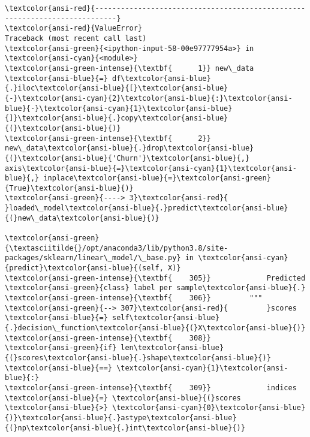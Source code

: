 \documentclass[11pt]{article}
\begin{document}
    \begin{Verbatim}[commandchars=\\\{\}, frame=single, framerule=2mm, rulecolor=\color{outerrorbackground}]
\textcolor{ansi-red}{---------------------------------------------------------------------------}
\textcolor{ansi-red}{ValueError}                                Traceback (most recent call last)
\textcolor{ansi-green}{<ipython-input-58-00e97777954a>} in \textcolor{ansi-cyan}{<module>}
\textcolor{ansi-green-intense}{\textbf{      1}} new\_data \textcolor{ansi-blue}{=} df\textcolor{ansi-blue}{.}iloc\textcolor{ansi-blue}{[}\textcolor{ansi-blue}{-}\textcolor{ansi-cyan}{2}\textcolor{ansi-blue}{:}\textcolor{ansi-blue}{-}\textcolor{ansi-cyan}{1}\textcolor{ansi-blue}{]}\textcolor{ansi-blue}{.}copy\textcolor{ansi-blue}{(}\textcolor{ansi-blue}{)}
\textcolor{ansi-green-intense}{\textbf{      2}} new\_data\textcolor{ansi-blue}{.}drop\textcolor{ansi-blue}{(}\textcolor{ansi-blue}{'Churn'}\textcolor{ansi-blue}{,} axis\textcolor{ansi-blue}{=}\textcolor{ansi-cyan}{1}\textcolor{ansi-blue}{,} inplace\textcolor{ansi-blue}{=}\textcolor{ansi-green}{True}\textcolor{ansi-blue}{)}
\textcolor{ansi-green}{----> 3}\textcolor{ansi-red}{ }loaded\_model\textcolor{ansi-blue}{.}predict\textcolor{ansi-blue}{(}new\_data\textcolor{ansi-blue}{)}

\textcolor{ansi-green}{\textasciitilde{}/opt/anaconda3/lib/python3.8/site-packages/sklearn/linear\_model/\_base.py} in \textcolor{ansi-cyan}{predict}\textcolor{ansi-blue}{(self, X)}
\textcolor{ansi-green-intense}{\textbf{    305}}             Predicted \textcolor{ansi-green}{class} label per sample\textcolor{ansi-blue}{.}
\textcolor{ansi-green-intense}{\textbf{    306}}         """
\textcolor{ansi-green}{--> 307}\textcolor{ansi-red}{         }scores \textcolor{ansi-blue}{=} self\textcolor{ansi-blue}{.}decision\_function\textcolor{ansi-blue}{(}X\textcolor{ansi-blue}{)}
\textcolor{ansi-green-intense}{\textbf{    308}}         \textcolor{ansi-green}{if} len\textcolor{ansi-blue}{(}scores\textcolor{ansi-blue}{.}shape\textcolor{ansi-blue}{)} \textcolor{ansi-blue}{==} \textcolor{ansi-cyan}{1}\textcolor{ansi-blue}{:}
\textcolor{ansi-green-intense}{\textbf{    309}}             indices \textcolor{ansi-blue}{=} \textcolor{ansi-blue}{(}scores \textcolor{ansi-blue}{>} \textcolor{ansi-cyan}{0}\textcolor{ansi-blue}{)}\textcolor{ansi-blue}{.}astype\textcolor{ansi-blue}{(}np\textcolor{ansi-blue}{.}int\textcolor{ansi-blue}{)}


\end{Verbatim}
\end{document}
